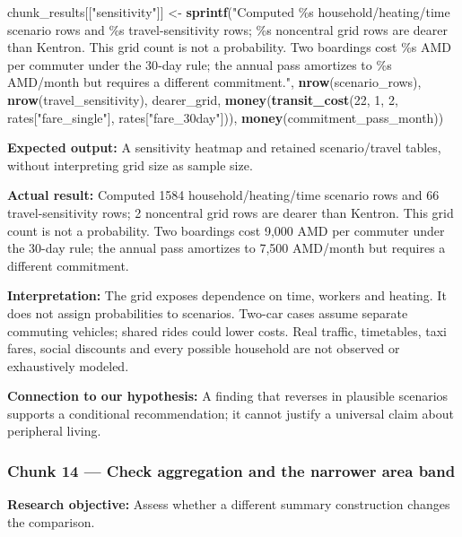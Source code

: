 \documentclass[
]{article}
\newenvironment{Shaded}{\begin{snugshade}}{\end{snugshade}}
\newcommand{\DecValTok}[1]{\textcolor[rgb]{0.00,0.00,0.81}{#1}}
\newcommand{\FunctionTok}[1]{\textcolor[rgb]{0.13,0.29,0.53}{\textbf{#1}}}
\newcommand{\NormalTok}[1]{#1}
\newcommand{\OtherTok}[1]{\textcolor[rgb]{0.56,0.35,0.01}{#1}}
\newcommand{\StringTok}[1]{\textcolor[rgb]{0.31,0.60,0.02}{#1}}
\begin{document}
\begin{Shaded}
\begin{Highlighting}[]
\NormalTok{chunk\_results[[}\StringTok{"sensitivity"}\NormalTok{]] }\OtherTok{\textless{}{-}} \FunctionTok{sprintf}\NormalTok{(}\StringTok{"Computed \%s household/heating/time scenario rows and \%s travel{-}sensitivity rows; \%s noncentral grid rows are dearer than Kentron. This grid count is not a probability. Two boardings cost \%s AMD per commuter under the 30{-}day rule; the annual pass amortizes to \%s AMD/month but requires a different commitment."}\NormalTok{,}
  \FunctionTok{nrow}\NormalTok{(scenario\_rows), }\FunctionTok{nrow}\NormalTok{(travel\_sensitivity), dearer\_grid, }\FunctionTok{money}\NormalTok{(}\FunctionTok{transit\_cost}\NormalTok{(}\DecValTok{22}\NormalTok{, }\DecValTok{1}\NormalTok{, }\DecValTok{2}\NormalTok{, rates[}\StringTok{"fare\_single"}\NormalTok{], rates[}\StringTok{"fare\_30day"}\NormalTok{])), }\FunctionTok{money}\NormalTok{(commitment\_pass\_month))}
\end{Highlighting}
\end{Shaded}

\textbf{Expected output:} A sensitivity heatmap and retained
scenario/travel tables, without interpreting grid size as sample size.

\textbf{Actual result:} Computed 1584 household/heating/time scenario
rows and 66 travel-sensitivity rows; 2 noncentral grid rows are dearer
than Kentron. This grid count is not a probability. Two boardings cost
9,000 AMD per commuter under the 30-day rule; the annual pass amortizes
to 7,500 AMD/month but requires a different commitment.

\textbf{Interpretation:} The grid exposes dependence on time, workers
and heating. It does not assign probabilities to scenarios. Two-car
cases assume separate commuting vehicles; shared rides could lower
costs. Real traffic, timetables, taxi fares, social discounts and every
possible household are not observed or exhaustively modeled.

\textbf{Connection to our hypothesis:} A finding that reverses in
plausible scenarios supports a conditional recommendation; it cannot
justify a universal claim about peripheral living.

\subsubsection{Chunk 14 --- Check aggregation and the narrower area
band}\label{chunk-14-check-aggregation-and-the-narrower-area-band}

\textbf{Research objective:} Assess whether a different summary
construction changes the comparison.
\end{document}
